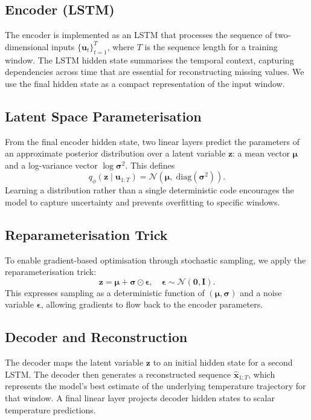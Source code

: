\subsection{Encoder (LSTM)}
The encoder is implemented as an LSTM that processes the sequence of two-dimensional inputs $\{\mathbf{u}_t\}_{t=1}^{T}$, where $T$ is the sequence length for a training window. The LSTM hidden state summarises the temporal context, capturing dependencies across time that are essential for reconstructing missing values. We use the final hidden state as a compact representation of the input window.

\subsection{Latent Space Parameterisation}
From the final encoder hidden state, two linear layers predict the parameters of an approximate posterior distribution over a latent variable $\mathbf{z}$: a mean vector $\boldsymbol{\mu}$ and a log-variance vector $\log \boldsymbol{\sigma}^2$. This defines
\[
q_\phi(\mathbf{z} \mid \mathbf{u}_{1:T}) = \mathcal{N}(\boldsymbol{\mu},\; \mathrm{diag}(\boldsymbol{\sigma}^2)).
\]
Learning a distribution rather than a single deterministic code encourages the model to capture uncertainty and prevents overfitting to specific windows.

\subsection{Reparameterisation Trick}
To enable gradient-based optimisation through stochastic sampling, we apply the reparameterisation trick:
\[
\mathbf{z} = \boldsymbol{\mu} + \boldsymbol{\sigma} \odot \boldsymbol{\epsilon}, \quad \boldsymbol{\epsilon} \sim \mathcal{N}(\mathbf{0},\mathbf{I}).
\]
This expresses sampling as a deterministic function of $(\boldsymbol{\mu}, \boldsymbol{\sigma})$ and a noise variable $\boldsymbol{\epsilon}$, allowing gradients to flow back to the encoder parameters.

\subsection{Decoder and Reconstruction}
The decoder maps the latent variable $\mathbf{z}$ to an initial hidden state for a second LSTM. The decoder then generates a reconstructed sequence $\hat{\mathbf{x}}_{1:T}$, which represents the model's best estimate of the underlying temperature trajectory for that window. A final linear layer projects decoder hidden states to scalar temperature predictions.

